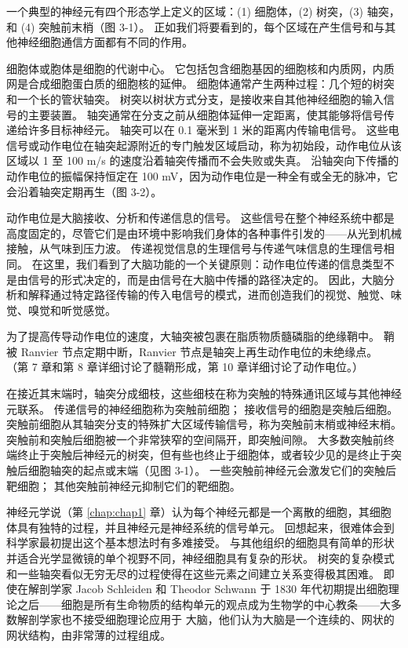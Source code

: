 一个典型的神经元有四个形态学上定义的区域：(1) 细胞体，(2) 树突，(3) 轴突，和 (4) 突触前末梢（图 3-1）。 
正如我们将要看到的，每个区域在产生信号和与其他神经细胞通信方面都有不同的作用。


细胞体或胞体是细胞的代谢中心。 
它包括包含细胞基因的细胞核和内质网，内质网是合成细胞蛋白质的细胞核的延伸。 
细胞体通常产生两种过程：几个短的树突和一个长的管状轴突。 
树突以树状方式分支，是接收来自其他神经细胞的输入信号的主要装置。 
轴突通常在分支之前从细胞体延伸一定距离，使其能够将信号传递给许多目标神经元。 
轴突可以在 0.1 毫米到 1 米的距离内传输电信号。 
这些电信号或动作电位在轴突起源附近的专门触发区域启动，称为初始段，动作电位从该区域以 1 至 100 m/s 的速度沿着轴突传播而不会失败或失真。 
沿轴突向下传播的动作电位的振幅保持恒定在 100 mV，因为动作电位是一种全有或全无的脉冲，它会沿着轴突定期再生（图 3-2）。


动作电位是大脑接收、分析和传递信息的信号。 
这些信号在整个神经系统中都是高度固定的，尽管它们是由环境中影响我们身体的各种事件引发的——从光到机械接触，从气味到压力波。 
传递视觉信息的生理信号与传递气味信息的生理信号相同。 
在这里，我们看到了大脑功能的一个关键原则：动作电位传递的信息类型不是由信号的形式决定的，而是由信号在大脑中传播的路径决定的。 
因此，大脑分析和解释通过特定路径传输的传入电信号的模式，进而创造我们的视觉、触觉、味觉、嗅觉和听觉感觉。


为了提高传导动作电位的速度，大轴突被包裹在脂质物质髓磷脂的绝缘鞘中。 
鞘被 Ranvier 节点定期中断，Ranvier 节点是轴突上再生动作电位的未绝缘点。 
（第 7 章和第 8 章详细讨论了髓鞘形成，第 10 章详细讨论了动作电位。）


在接近其末端时，轴突分成细枝，这些细枝在称为突触的特殊通讯区域与其他神经元联系。 
传递信号的神经细胞称为突触前细胞； 接收信号的细胞是突触后细胞。 
突触前细胞从其轴突分支的特殊扩大区域传输信号，称为突触前末梢或神经末梢。 
突触前和突触后细胞被一个非常狭窄的空间隔开，即突触间隙。 
大多数突触前终端终止于突触后神经元的树突，但有些也终止于细胞体，或者较少见的是终止于突触后细胞轴突的起点或末端（见图 3-1）。 
一些突触前神经元会激发它们的突触后靶细胞； 其他突触前神经元抑制它们的靶细胞。


神经元学说（第 \ref{chap:chap1} 章）认为每个神经元都是一个离散的细胞，其细胞体具有独特的过程，并且神经元是神经系统的信号单元。 
回想起来，很难体会到科学家最初提出这个基本想法时有多难接受。 
与其他组织的细胞具有简单的形状并适合光学显微镜的单个视野不同，神经细胞具有复杂的形状。 
树突的复杂模式和一些轴突看似无穷无尽的过程使得在这些元素之间建立关系变得极其困难。 
即使在解剖学家 Jacob Schleiden 和 Theodor Schwann 于 1830 年代初期提出细胞理论之后——细胞是所有生命物质的结构单元的观点成为生物学的中心教条——大多数解剖学家也不接受细胞理论应用于 大脑，他们认为大脑是一个连续的、网状的网状结构，由非常薄的过程组成。


